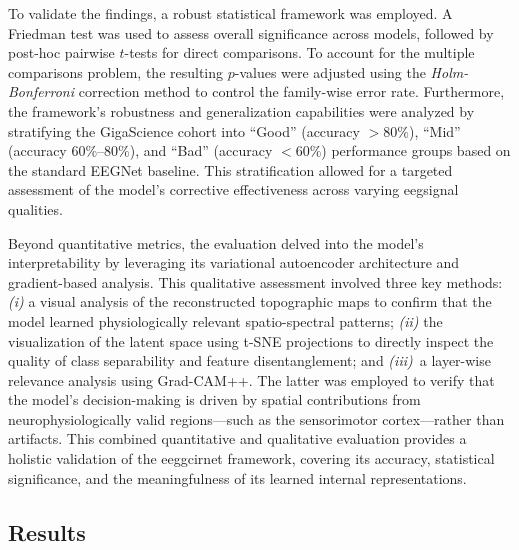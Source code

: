 To validate the findings, a robust statistical framework was employed. A Friedman test was used to assess overall significance across models, followed by post-hoc pairwise $t$-tests for direct comparisons. To account for the multiple comparisons problem, the resulting $p$-values were adjusted using the \textit{Holm-Bonferroni} correction method to control the family-wise error rate. Furthermore, the framework's robustness and generalization capabilities were analyzed by stratifying the GigaScience cohort into ``Good'' (accuracy $> 80\%$), ``Mid'' (accuracy $60\%$--$80\%$), and ``Bad'' (accuracy $< 60\%$) performance groups based on the standard EEGNet baseline. This stratification allowed for a targeted assessment of the model's corrective effectiveness across varying \gls{eeg}signal qualities.

Beyond quantitative metrics, the evaluation delved into the model's interpretability by leveraging its variational autoencoder architecture and gradient-based analysis. This qualitative assessment involved three key methods: \textit{(i)} a visual analysis of the reconstructed topographic maps to confirm that the model learned physiologically relevant spatio-spectral patterns; \textit{(ii)} the visualization of the latent space using t-SNE projections to directly inspect the quality of class separability and feature disentanglement; and \textit{(iii)}~a layer-wise relevance analysis using Grad-CAM++. The latter was employed to verify that the model's decision-making is driven by spatial contributions from neurophysiologically valid regions---such as the sensorimotor cortex---rather than artifacts. This combined quantitative and qualitative evaluation provides a holistic validation of the \gls{eeggcirnet} framework, covering its accuracy, statistical significance, and the meaningfulness of its learned internal representations.

\subsection{Results}\label{sec:Results}

